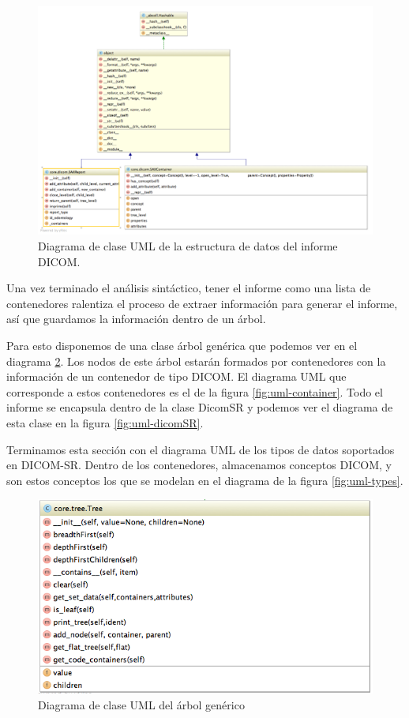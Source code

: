 \begin{figure}[ht]
\centering
\includegraphics[scale=0.35]{./imgs/diagramasUML/core/dicom.png}
\caption{Diagrama de clase UML de la estructura de datos del informe DICOM.}
\label{fig:uml-dicom}
\end{figure}

Una vez terminado el análisis sintáctico, tener el informe como una lista de contenedores ralentiza el proceso de extraer información para generar el informe, así que guardamos la información dentro de un árbol.\par
Para esto disponemos de una clase árbol genérica que podemos ver en el diagrama \ref{fig:uml-tree}. Los nodos de este árbol estarán formados por contenedores con la información de un contenedor de tipo DICOM. El diagrama UML que corresponde a estos contenedores es el de la figura \ref{fig:uml-container}. Todo el informe se encapsula dentro de la clase DicomSR y podemos ver el diagrama de esta clase en la figura \ref{fig:uml-dicomSR}.\medskip \par

Terminamos esta sección con el diagrama UML de los tipos de datos soportados en DICOM-SR. Dentro de los contenedores, almacenamos conceptos DICOM, y son estos conceptos los que se modelan en el diagrama de la figura \ref{fig:uml-types}.
\begin{figure}[ht]
\centering
\includegraphics[scale=0.5]{./imgs/diagramasUML/core/tree.png}
\caption{Diagrama de clase UML del árbol genérico}
\label{fig:uml-tree}
\end{figure}


